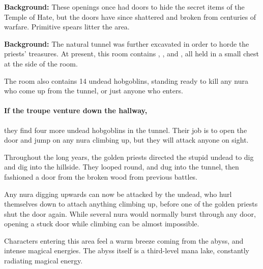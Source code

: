 
\textbf{Background:}
These openings once had doors to hide the secret items of the Temple of Hate, but the doors have since shattered and broken from centuries of warfare.
Primitive spears litter the area.


\textbf{Background:}
The natural tunnel was further excavated in order to horde the priests' treasures.
At present, this room contains \lootMedium, \lootBig, and \lootMagic, all held in a small chest at the side of the room.

The room also contains 14 undead hobgoblins, standing ready to kill any nura who come up from the tunnel, or just anyone who enters.



\paragraph{If the troupe venture down the hallway,}
they find four more undead hobgoblins in the tunnel.
Their job is to open the door and jump on any nura climbing up, but they will attack anyone on sight.


\begin{exampletext}

  Throughout the long years, the golden priests directed the stupid undead to dig and dig into the hillside.
  They looped round, and dug into the tunnel, then fashioned a door from the broken wood from previous battles.

Any nura digging upwards can now be attacked by the undead, who hurl themselves down to attach anything climbing up, before one of the golden priests shut the door again.
While several nura would normally burst through any door, opening a stuck door while climbing can be almost impossible.

\end{exampletext}


Characters entering this area feel a warm breeze coming from the abyss, and intense magical energies.
The abyss itself is a third-level mana lake, constantly radiating magical energy.


